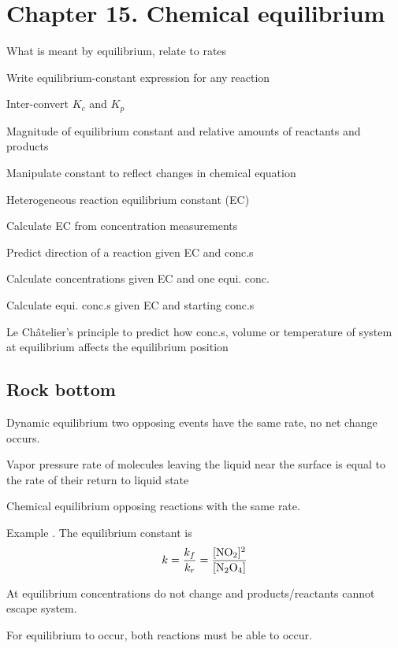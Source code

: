 \section{Chapter 15. Chemical equilibrium}


\secttoc

{\footnotesize
\begin{multicols}{3}
\begin{compactenum}
    \item What is meant by equilibrium, relate to rates
    \item Write equilibrium-constant expression for any reaction
    \item Inter-convert $K_c$ and $K_p$
    \item Magnitude of equilibrium constant and relative amounts of reactants
        and products
    \item Manipulate constant to reflect changes in chemical equation
    \item Heterogeneous reaction equilibrium constant (EC)
    \item Calculate EC from concentration measurements
    \item Predict direction of a reaction given EC and conc.s
    \item Calculate concentrations given EC and one equi. conc.
    \item Calculate equi. conc.s given EC and starting conc.s
    \item Le Ch\^{a}telier's principle to predict how conc.s, volume or temperature
        of system at equilibrium affects the equilibrium position
\end{compactenum}
\end{multicols}
}

\begin{mdframed}
\begin{multicols}{2}
\subsection{Rock bottom}
\begin{compactdesc}
    \item[Dynamic equilibrium] two opposing events have the same rate, no net
        change occurs.
    \item[Vapor pressure] rate of molecules leaving the liquid near the surface
        is equal to the rate of their return to liquid state
    \item[Chemical equilibrium] opposing reactions with the same rate.
    \item[Example] . The
        equilibrium constant is \[
            k = \frac{k_f}{k_r} = \frac{[\ce{NO2}]^2}{[\ce{N2O4}]}
        \]
    \item[At equilibrium] concentrations do not change and products/reactants
        cannot escape system.
    \item[For equilibrium] to occur, both reactions must be able to occur.
\end{compactdesc}
\end{multicols}
\end{mdframed}



